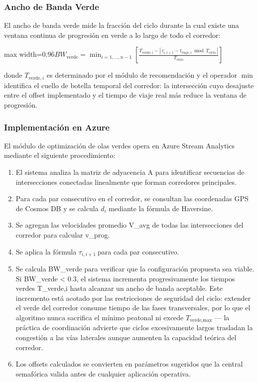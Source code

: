 \documentclass[12pt,a4paper,oneside]{report}
\newenvironment{centeredmath}
  {\begin{center}\begin{adjustbox}{max width=0.96\linewidth}\(\displaystyle}
  {\)\end{adjustbox}\end{center}}
\begin{document}
\subsubsection{Ancho de Banda Verde}

El ancho de banda verde mide la fracción del ciclo durante la cual existe una ventana continua de progresión en verde a lo largo de todo el corredor:

\begin{centeredmath}
BW_{\text{verde}} = \min_{i=1,\ldots,n-1}\left[\frac{T_{\text{verde},i}-\left|\,\tau_{i,i+1}-t_{\text{viaje},i} \bmod T_{\text{ciclo}}\,\right|}{T_{\text{ciclo}}}\right]
\end{centeredmath}

donde \(T_{\text{verde},i}\) es determinado por el módulo de recomendación y el operador \(\min\) identifica el cuello de botella temporal del corredor: la intersección cuyo desajuste entre el offset implementado y el tiempo de viaje real más reduce la ventana de progresión.

\subsubsection{Implementación en Azure}

El módulo de optimización de olas verdes opera en Azure Stream Analytics mediante el siguiente procedimiento:

\begin{enumerate}
\def\labelenumi{\arabic{enumi}.}
\item
  El sistema analiza la matriz de adyacencia A para identificar secuencias de intersecciones conectadas linealmente que forman corredores principales.
\item
  Para cada par consecutivo en el corredor, se consultan las coordenadas GPS de Cosmos DB y se calcula \(d_i\) mediante la fórmula de Haversine.
\item
  Se agregan las velocidades promedio V\_avg de todas las intersecciones del corredor para calcular v\_prog.
\item
  Se aplica la fórmula \(\tau_{i,i + 1}\ \)para cada par consecutivo.
\item
  Se calcula BW\_verde para verificar que la configuración propuesta sea viable. Si BW\_verde \textless{} 0.3, el sistema incrementa progresivamente los tiempos verdes T\_verde,i hasta alcanzar un ancho de banda aceptable. Este incremento está acotado por las restricciones de seguridad del ciclo: extender el verde del corredor consume tiempo de las fases transversales, por lo que el algoritmo nunca sacrifica el mínimo peatonal ni excede \(T_{\text{verde,max}}\) --- la práctica de coordinación advierte que ciclos excesivamente largos trasladan la congestión a las vías laterales aunque aumenten la capacidad teórica del corredor.
\item
  Los offsets calculados se convierten en parámetros sugeridos que la central semafórica valida antes de cualquier aplicación operativa.
\end{enumerate}
\end{document}
